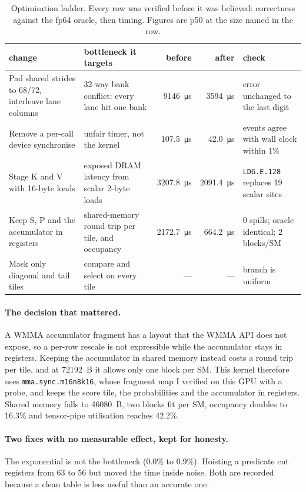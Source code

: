 \documentclass[10pt,a4paper]{article}
\begin{document}
\begin{table}[H]
\centering\small
\caption{Optimisation ladder. Every row was verified before it was believed: correctness against the
fp64 oracle, then timing. Figures are p50 at the size named in the row.}
\label{tab:steps}
\begin{tabular}{@{}p{3.5cm}p{4.4cm}rrl@{}}
\toprule
change & bottleneck it targets & before & after & check \\
\midrule
Pad shared strides to 68/72, interleave lane columns & 32-way bank conflict: every lane hit one bank &
\SI{9146}{\micro\second} & \SI{3594}{\micro\second} & error unchanged to the last digit \\
Remove a per-call device synchronise & unfair timer, not the kernel & \SI{107.5}{\micro\second} &
\SI{42.0}{\micro\second} & events agree with wall clock within 1\% \\
Stage K and V with 16-byte loads & exposed DRAM latency from scalar 2-byte loads &
\SI{3207.8}{\micro\second} & \SI{2091.4}{\micro\second} & \texttt{LDG.E.128} replaces 19 scalar sites \\
Keep S, P and the accumulator in registers & shared-memory round trip per tile, and occupancy &
\SI{2172.7}{\micro\second} & \SI{664.2}{\micro\second} & 0 spills; oracle identical; 2 blocks/SM \\
Mask only diagonal and tail tiles & compare and select on every tile & --- & --- & branch is uniform \\
\bottomrule
\end{tabular}
\end{table}

\paragraph{The decision that mattered.} A WMMA accumulator fragment has a layout that the WMMA API does
not expose, so a per-row rescale is not expressible while the accumulator stays in registers. Keeping
the accumulator in shared memory instead costs a round trip per tile, and at 72192~B it allows only one
block per SM. This kernel therefore uses \texttt{mma.sync.m16n8k16}, whose fragment map I verified on
this GPU with a probe, and keeps the score tile, the probabilities and the accumulator in registers.
Shared memory falls to 46080~B, two blocks fit per SM, occupancy doubles to 16.3\% and tensor-pipe
utilisation reaches 42.2\%.

\paragraph{Two fixes with no measurable effect, kept for honesty.} The exponential is not the
bottleneck (0.0\% to 0.9\%). Hoisting a predicate cut registers from 63 to 56 but moved the time inside
noise. Both are recorded because a clean table is less useful than an accurate one.
\end{document}
